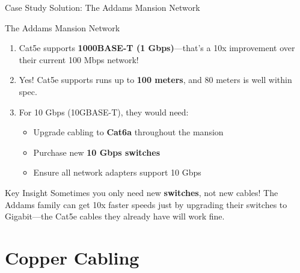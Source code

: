 \documentclass[aspectratio=169]{beamer}  %
\begin{document}
\begin{frame}{Case Study Solution: The Addams Mansion Network}
    \begin{casesolution}{The Addams Mansion Network}
        \begin{enumerate}
            \item Cat5e supports \textbf{1000BASE-T (1 Gbps)}---that's a 10x improvement over their current 100 Mbps network!
            \item Yes! Cat5e supports runs up to \textbf{100 meters}, and 80 meters is well within spec.
            \item For 10 Gbps (10GBASE-T), they would need:
                \begin{itemize}
                    \item Upgrade cabling to \textbf{Cat6a} throughout the mansion
                    \item Purchase new \textbf{10 Gbps switches}
                    \item Ensure all network adapters support 10 Gbps
                \end{itemize}
        \end{enumerate}
    \end{casesolution}
    
    \begin{alertblock}{Key Insight}
        Sometimes you only need new \textbf{switches}, not new cables! The Addams family can get 10x faster speeds just by upgrading their switches to Gigabit---the Cat5e cables they already have will work fine.
    \end{alertblock}
\end{frame}

\section{Copper Cabling}

\end{document}
